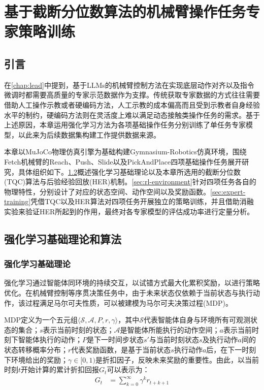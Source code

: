 \chapter{基于截断分位数算法的机械臂操作任务专家策略训练}\label{chap:reinforce}
\section{引言}\label{sec:reinforce-intro}
在\cref{chap:lead}中提到，基于LLMs的机械臂控制方法在实现底层动作对齐以及指令微调时都需要高质量的专家示范数据作为支撑。传统获取专家数据的方式往往需要借助人工操作示教或者硬编码方法，人工示教的成本偏高而且受到示教者自身经验水平的制约，硬编码方法则在灵活度上难以满足动态接触类操作任务的需求。基于上述原因，本章运用强化学习方法为各项基础操作任务分别训练了单任务专家模型，以此来为后续数据集构建工作提供数据来源。

本章以MuJoCo物理仿真引擎为基础构建Gymnasium-Robotics仿真环境，围绕Fetch机械臂的Reach、Push、Slide以及PickAndPlace四项基础操作任务展开研究，具体组织如下。\cref{sec:rl-theory}概述强化学习基础理论以及本章所选用的截断分位数(TQC)算法与后验经验回放(HER)机制。\cref{sec:rl-environment}针对四项任务各自的物理特性，分别设计了对应的状态空间、动作空间以及奖励函数。\cref{sec:expert-training}凭借TQC以及HER算法对四项任务开展独立的策略训练，并且借助消融实验来验证HER所起到的作用，最终对各专家模型的评估成功率进行定量分析。

\section{强化学习基础理论和算法}\label{sec:rl-theory}
\subsection{强化学习基础理论}\label{sec:rl-basics}
强化学习通过智能体同环境的持续交互，以试错方式最大化累积奖励，以进行策略优化。在机械臂控制等序贯决策任务中，由于未来状态仅依赖于当前状态与执行动作，该过程满足马尔可夫性质，可以被建模为马尔可夫决策过程(MDP)。

MDP定义为一个五元组$\langle \mathcal{S}, \mathcal{A}, P, r, \gamma \rangle$，其中$\mathcal{S}$代表智能体自身与环境所有可观测状态的集合；$s$表示当前时刻的状态；$\mathcal{A}$是智能体所能执行的动作空间；$a$表示当前时刻下智能体执行的动作；$P$是下一时间步状态$s'$与当前时刻状态$s$及执行动作$a$间的状态转移概率分布；$r$代表奖励函数，是基于当前状态$s$执行动作$a$后，在下一时刻下环境给出的奖励；$\gamma \in [0,1)$是折扣因子，反映未来奖励的重要性。由此，以当前时刻$t$开始计算的累计折扣回报$G_t$可以表示为：
\begin{align}
    G_t &= \sum_{k=0}^{\infty} \gamma^k r_{t+k+1}
\end{align}

